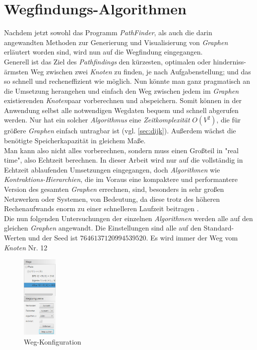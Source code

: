 \documentclass[12pt]{article}
\begin{document}
\section{Wegfindungs-Algorithmen}
Nachdem jetzt sowohl das Programm \textit{PathFinder}, als auch die darin angewandten Methoden zur Generierung und Visualisierung von \textit{Graphen} erläutert worden sind, wird nun auf die Wegfindung eingegangen.
\\
Generell ist das Ziel des \textit{Pathfindings} den kürzesten, optimalen oder hinderniss- ärmsten Weg zwischen zwei \textit{Knoten} zu finden, je nach Aufgabenstellung; und das so schnell und recheneffizient wie möglich. Nun könnte man ganz pragmatisch an die Umsetzung herangehen und einfach den Weg zwischen jedem im \textit{Graphen} existierenden \textit{Knoten}paar vorberechnen und abspeichern. Somit können in der Anwendung selbst alle notwendigen Wegdaten bequem und schnell abgerufen werden. Nur hat ein solcher \textit{Algorithmus} eine \textit{Zeitkomplexität} $O(V^2)$, die für größere \textit{Graphen} einfach untragbar ist (vgl. \autoref{sec:dijk}). Außerdem wächst die benötigte Speicherkapazität in gleichem Maße.
\\
Man kann also nicht alles vorberechnen, sondern muss einen Großteil in "real time", also Echtzeit berechnen. In dieser Arbeit wird nur auf die vollständig in Echtzeit ablaufenden Umsetzungen eingegangen, doch \textit{Algorithmen} wie \textit{Kontraktions-Hierarchien}, die im Voraus eine kompaktere und performantere Version des gesamten \textit{Graphen} errechnen, sind, besonders in sehr großen Netzwerken oder Systemen, von Bedeutung, da diese trotz des höheren Rechenaufwands enorm zu einer schnelleren Laufzeit beitragen \cite{contr-hier}.
\\
Die nun folgenden Untersuchungen der einzelnen \textit{Algorithmen} werden alle auf den gleichen \textit{Graphen} angewandt. Die Einstellungen sind alle auf den Standard-Werten und der Seed ist $7646137120994539520$. Es wird immer der Weg vom \textit{Knoten} Nr. 12
\begin{figure}
\vspace{-20pt}
\begin{center}
\includegraphics[width=0.15\textwidth]{res/path_cfg.png}
\end{center}
\vspace{-20pt}
\centering
\caption{Weg-Konfiguration}
\label{fig:path-cfg}
\end{figure}
\end{document}

